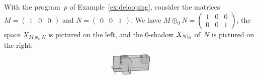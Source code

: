\documentclass[orivec]{llncs} \usepackage[T1]{fontenc}
\newcommand{\glue}[1]{\oplus_{#1}}
\begin{document}
\begin{example}
  With the program~$p$ of Example~\ref{ex:delooping}, consider the matrices
  $M=(\begin{matrix}1&0&0\end{matrix})$ and
  $N=(\begin{matrix}0&0&1\end{matrix})$. We have $M\glue
  0N=\left(\begin{matrix}1&0&0\\0&0&1\end{matrix}\right)$, the space $X_{M\glue
    0 N}$ is pictured on the left, and the $0$-shadow $X_{\shadow 0N}$ of~$N$ is
  pictured on the right:
  \[
  \begin{tikzpicture}[line join=round,opacity=0.7]
\draw[arrows=->](.786,-.786)--(.561,-.354);
\filldraw[fill=gray](2.436,-.206)--(2.473,.125)--(2.331,.24)--(2.298,-.08)--cycle;
\filldraw[fill=lightgray](2.401,-.527)--(2.473,.125)--(2.331,.24)--(2.266,-.391)--cycle;
\filldraw[fill=gray](1.973,-.098)--(2.298,-.08)--(2.331,.24)--(2.002,.224)--cycle;
\filldraw[fill=lightgray](.63,-.487)--(1.295,-.448)--(1.333,.192)--(.649,.158)--cycle;
\filldraw[fill=lightgray](.63,-.487)--(2.266,-.391)--(2.331,.24)--(.649,.158)--cycle;
\filldraw[fill=lightgray](.705,-.631)--(2.401,-.527)--(2.266,-.391)--(.63,-.487)--cycle;
\filldraw[fill=gray](2.1,-.225)--(2.436,-.206)--(2.298,-.08)--(1.973,-.098)--cycle;
\filldraw[fill=gray](1.416,-.263)--(1.437,.072)--(1.333,.192)--(1.314,-.133)--cycle;
\filldraw[fill=gray](2.1,-.225)--(2.132,.107)--(2.002,.224)--(1.973,-.098)--cycle;
\filldraw[fill=lightgray,draw=none](1.395,-.589)--(2.401,-.527)--(2.473,.125)--(1.437,.072)--cycle;
\draw(1.395,-.589)--(2.401,-.527)--(2.473,.125)--(1.437,.072);
\filldraw[fill=lightgray](1.503,-.741)--(1.55,-.057)--(1.333,.192)--(1.295,-.448)--cycle;
\filldraw[fill=lightgray](1.147,-.763)--(1.503,-.741)--(1.295,-.448)--(.964,-.468)--cycle;
\filldraw[fill=lightgray](.964,-.468)--(1.295,-.448)--(1.333,.192)--(.993,.175)--cycle;
\filldraw[fill=lightgray](1.395,-.589)--(1.437,.072)--(1.333,.192)--(1.295,-.448)--cycle;
\filldraw[fill=lightgray](.705,-.631)--(1.395,-.589)--(1.295,-.448)--(.63,-.487)--cycle;
\filldraw[fill=gray](1.068,-.283)--(1.416,-.263)--(1.314,-.133)--(.978,-.151)--cycle;
\filldraw[fill=gray](.978,-.151)--(1.314,-.133)--(1.333,.192)--(.993,.175)--cycle;
\filldraw[fill=lightgray,draw=none](1.052,-.61)--(1.395,-.589)--(1.437,.072)--(1.084,.055)--cycle;
\draw(1.052,-.61)--(1.395,-.589)--(1.437,.072)--(1.084,.055);
\filldraw[fill=lightgray,draw=none](1.052,-.61)--(1.395,-.589)--(1.437,.072)--(1.084,.055)--cycle;

\end{tikzpicture}\]
\end{example}
\end{document}
